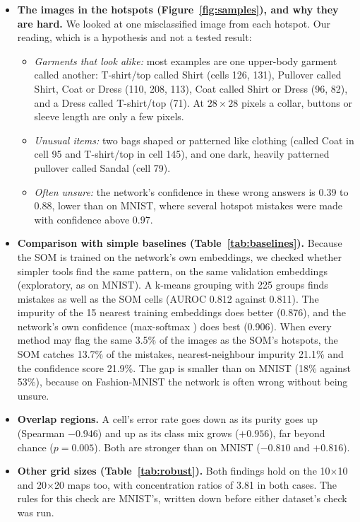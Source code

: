 \documentclass[11pt]{article}
\begin{document}
\begin{itemize}[leftmargin=1.4em, itemsep=2pt]
\item \textbf{The images in the hotspots (Figure~\ref{fig:samples}), and why they are hard.} We looked at one misclassified image from each hotspot. Our reading, which is a hypothesis and not a tested result:
  \begin{itemize}[leftmargin=1.2em, itemsep=0pt]
  \item \emph{Garments that look alike:} most examples are one upper-body garment called another: T-shirt/top called Shirt (cells 126, 131), Pullover called Shirt, Coat or Dress (110, 208, 113), Coat called Shirt or Dress (96, 82), and a Dress called T-shirt/top (71). At $28\times28$ pixels a collar, buttons or sleeve length are only a few pixels.
  \item \emph{Unusual items:} two bags shaped or patterned like clothing (called Coat in cell 95 and T-shirt/top in cell 145), and one dark, heavily patterned pullover called Sandal (cell 79).
  \item \emph{Often unsure:} the network's confidence in these wrong answers is 0.39 to 0.88, lower than on MNIST, where several hotspot mistakes were made with confidence above 0.97.
  \end{itemize}

\item \textbf{Comparison with simple baselines (Table~\ref{tab:baselines}).} Because the SOM is trained on the network's own embeddings, we checked whether simpler tools find the same pattern, on the same validation embeddings (exploratory, as on MNIST). A k-means grouping with 225 groups finds mistakes as well as the SOM cells (AUROC 0.812 against 0.811). The impurity of the 15 nearest training embeddings does better (0.876), and the network's own confidence (max-softmax \cite{hendrycks2017baseline}) does best (0.906). When every method may flag the same 3.5\% of the images as the SOM's hotspots, the SOM catches 13.7\% of the mistakes, nearest-neighbour impurity 21.1\% and the confidence score 21.9\%. The gap is smaller than on MNIST (18\% against 53\%), because on Fashion-MNIST the network is often wrong without being unsure.

\item \textbf{Overlap regions.} A cell's error rate goes down as its purity goes up (Spearman $-0.946$) and up as its class mix grows ($+0.956$), far beyond chance ($p=0.005$). Both are stronger than on MNIST ($-0.810$ and $+0.816$).

\item \textbf{Other grid sizes (Table~\ref{tab:robust}).} Both findings hold on the 10$\times$10 and 20$\times$20 maps too, with concentration ratios of 3.81 in both cases. The rules for this check are MNIST's, written down before either dataset's check was run.


\end{itemize}
\end{document}
